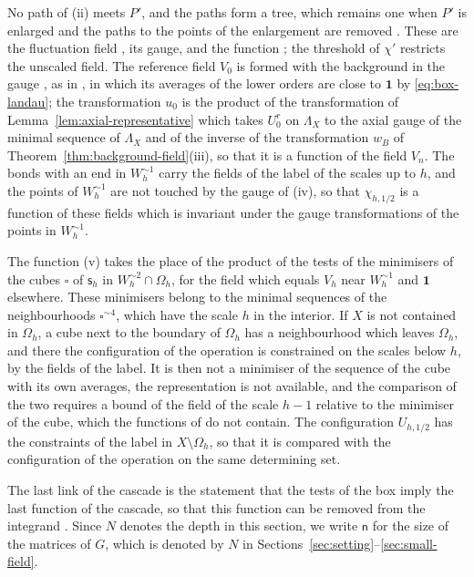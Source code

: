 \documentclass[11pt]{preprint}
\newcommand{\id}{\mathbf 1}
\numberwithin{equation}{section}
\begin{document}
No path of (ii) meets $P'$, and the paths form a tree, which remains one when $P'$ is enlarged and the paths to the points of the enlargement are removed \cite[pp.~195--196]{BalabanLFR1}. These are the fluctuation field \cite[(1.81)]{BalabanLFR1}, its gauge, and the function \cite[(1.82)]{BalabanLFR1}; the threshold of $\chi'$ restricts the unscaled field. The reference field $V_0$ is formed with the background in the gauge \cite[(1.86)]{BalabanLFR1}, as in \cite[(1.92)]{BalabanLFR1}, in which its averages of the lower orders are close to $\id$ by \eqref{eq:box-landau}; the transformation $u_0$ is the product of the transformation of Lemma~\ref{lem:axial-representative} which takes $U^r_0$ on $\Lambda_X$ to the axial gauge of the minimal sequence of $\Lambda_X$ and of the inverse of the transformation $w_B$ of Theorem~\ref{thm:background-field}(iii), so that it is a function of the field $V_n$. The bonds with an end in $W_h^{\sim1}$ carry the fields of the label of the scales up to $h$, and the points of $W_h^{\sim1}$ are not touched by the gauge of (iv), so that $\chi_{h,1/2}$ is a function of these fields which is invariant under the gauge transformations of the points in $W_h^{\sim1}$.

The function (v) takes the place of the product \cite[(1.88)]{BalabanLFR1} of the tests of the minimisers of the cubes $\square$ of $\mathsf s_h$ in $W_h^{\sim2} \cap \Omega_h$, for the field which equals $V_h$ near $W_h^{\sim1}$ and $\id$ elsewhere. These minimisers belong to the minimal sequences of the neighbourhoods $\square^{\sim4}$, which have the scale $h$ in the interior. If $X$ is not contained in $\Omega_h$, a cube next to the boundary of $\Omega_h$ has a neighbourhood which leaves $\Omega_h$, and there the configuration of the operation is constrained on the scales below $h$, by the fields of the label. It is then not a minimiser of the sequence of the cube with its own averages, the representation \cite[(1.90)]{BalabanLFR1} is not available, and the comparison of the two requires a bound of the field of the scale $h - 1$ relative to the minimiser of the cube, which the functions of \cite[(1.89)]{BalabanLFR1} do not contain. The configuration $U_{h,1/2}$ has the constraints of the label in $X \setminus \Omega_h$, so that it is compared with the configuration of the operation on the same determining set.

The last link of the cascade is the statement that the tests of the box imply the last function of the cascade, so that this function can be removed from the integrand \cite[(1.89), p.~198]{BalabanLFR1}. Since $N$ denotes the depth in this section, we write $\mathsf n$ for the size of the matrices of $G$, which is denoted by $N$ in Sections~\ref{sec:setting}--\ref{sec:small-field}.
\end{document}
